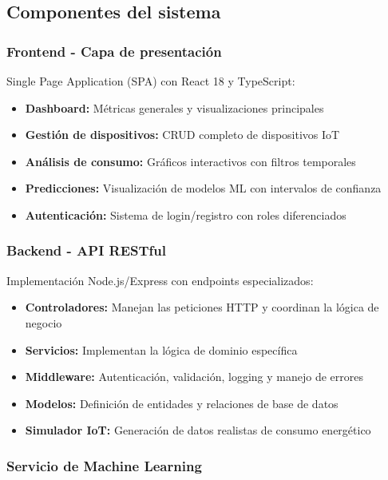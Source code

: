 \subsection{Componentes del sistema}

\subsubsection{Frontend - Capa de presentación}

Single Page Application (SPA) con React 18 y TypeScript:

\begin{itemize}
    \item \textbf{Dashboard:} Métricas generales y visualizaciones principales
    \item \textbf{Gestión de dispositivos:} CRUD completo de dispositivos IoT
    \item \textbf{Análisis de consumo:} Gráficos interactivos con filtros temporales
    \item \textbf{Predicciones:} Visualización de modelos ML con intervalos de confianza
    \item \textbf{Autenticación:} Sistema de login/registro con roles diferenciados
\end{itemize}

\subsubsection{Backend - API RESTful}

Implementación Node.js/Express con endpoints especializados:

\begin{itemize}
    \item \textbf{Controladores:} Manejan las peticiones HTTP y coordinan la lógica de negocio
    \item \textbf{Servicios:} Implementan la lógica de dominio específica
    \item \textbf{Middleware:} Autenticación, validación, logging y manejo de errores
    \item \textbf{Modelos:} Definición de entidades y relaciones de base de datos
    \item \textbf{Simulador IoT:} Generación de datos realistas de consumo energético
\end{itemize}

\subsubsection{Servicio de Machine Learning}

